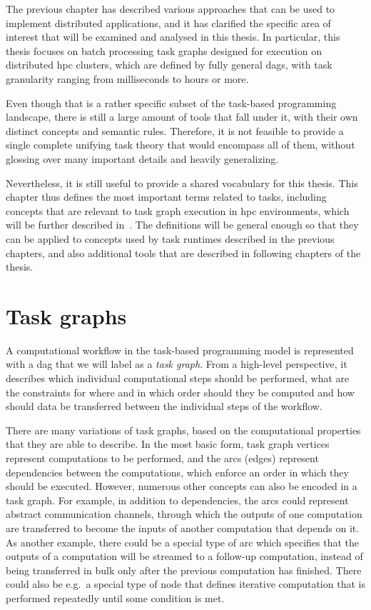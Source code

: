 The previous chapter has described various approaches that can be used to implement distributed
applications, and it has clarified the specific area of interest that will be examined and analysed
in this thesis. In particular, this thesis focuses on batch processing task graphs designed for
execution on distributed \gls{hpc} clusters, which are defined by fully general
\glspl{dag}, with task granularity ranging from milliseconds to hours or more.

Even though that is a rather specific subset of the task-based programming landscape, there is
still a large amount of tools that fall under it, with their own distinct concepts and semantic
rules. Therefore, it is not feasible to provide a single complete unifying task theory that would
encompass all of them, without glossing over many important details and heavily generalizing.

Nevertheless, it is still useful to provide a shared vocabulary for this thesis. This chapter thus
defines the most important terms related to tasks, including concepts that are relevant to task
graph execution in \gls{hpc} environments, which will be further described
in~. The definitions will be general enough so that they can be applied to
concepts used by task runtimes described in the previous chapters, and also additional tools that
are described in following chapters of the thesis. %

\section{Task graphs}
A computational workflow in the task-based programming model is represented with a
\gls{dag} that we will label as a \emph{task graph}. From a high-level
perspective, it describes which individual computational steps should be performed, what are the
constraints for where and in which order should they be computed and how should data be transferred
between the individual steps of the workflow.

There are many variations of task graphs, based on the computational properties that they are able
to describe. In the most basic form, task graph vertices represent computations to be performed,
and the arcs (edges) represent dependencies between the computations, which enforce an order in
which they should be executed. However, numerous other concepts can also be encoded in a task
graph. For example, in addition to dependencies, the arcs could represent abstract communication
channels, through which the outputs of one computation are transferred to become the inputs of
another computation that depends on it. As another example, there could be a special type of arc
which specifies that the outputs of a computation will be streamed to a follow-up computation,
instead of being transferred in bulk only after the previous computation has finished. There could
also be e.g.\ a special type of node that defines iterative computation that is performed
repeatedly until some condition is met.

